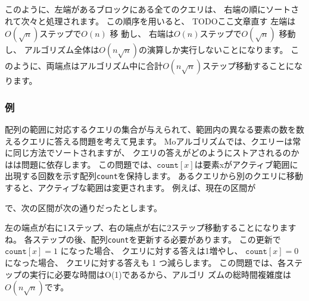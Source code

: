 このように、左端があるブロックにある全てのクエリは、
右端の順にソートされて次々と処理されます。
この順序を用いると、
TODOここ文章直す
左端は$O(\sqrt n)$ステップで$O(n)$ 移 動し、
右端は$O(n)$ステップで$O(\sqrt n)$ 移動し、
アルゴリズム全体は$O(n \sqrt n)$の演算しか実行しないことになります。
このように、両端点はアルゴリズム中に合計$O(n \sqrt n)$ステップ移動することになります。

\subsubsection*{例}

配列の範囲に対応するクエリの集合が与えられて、範囲内の異なる要素の数を数えるクエリに答える問題を考えて見ます。
Moアルゴリズムでは、クエリーは常に同じ方法でソートされますが、
クエリの答えがどのようにストアされるのかはは問題に依存します。
この問題では、$\texttt{count}[x]$は要素xがアクティブ範囲に出現する回数を示す配列\texttt{count}を保持します。
あるクエリから別のクエリに移動すると、アクティブな範囲は変更されます。
例えば、現在の区間が

\begin{center}
\end{center}
で、次の区間が次の通りだったとします。
\begin{center}
\end{center}
左の端点が右に1ステップ、右の端点が右に2ステップ移動することになりますね。
各ステップの後、配列\texttt{count}を更新する必要があります。
この更新で$\texttt{count}[x]=1$ になった場合、 クエリに対する答えは1増やし、
$\texttt{count}[x]=0$ になった場合、 クエリに対する答えも 1 つ減らします。
この問題では、各ステップの実行に必要な時間はO(1)であるから、アルゴリ ズムの総時間複雑度は$O(n \sqrt n)$です。
